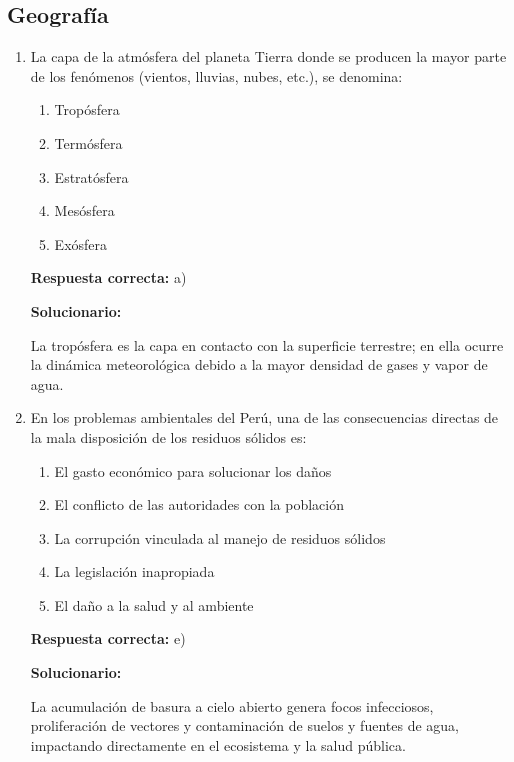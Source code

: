 \subsection*{Geografía}

\begin{enumerate}[resume]
	\item La capa de la atmósfera del planeta Tierra donde se producen la mayor parte de los fenómenos (vientos, lluvias, nubes, etc.), se denomina:
	\begin{enumerate}[label=\alph*)]
		\item Tropósfera
		\item Termósfera
		\item Estratósfera
		\item Mesósfera
		\item Exósfera
	\end{enumerate}
	\textbf{Respuesta correcta:} a)

	\vspace{2mm}
	\textbf{Solucionario:}

	La tropósfera es la capa en contacto con la superficie terrestre; en ella ocurre la dinámica meteorológica debido a la mayor densidad de gases y vapor de agua.

	\vspace{6mm}

	\item En los problemas ambientales del Perú, una de las consecuencias directas de la mala disposición de los residuos sólidos es:
	\begin{enumerate}[label=\alph*)]
		\item El gasto económico para solucionar los daños
		\item El conflicto de las autoridades con la población
		\item La corrupción vinculada al manejo de residuos sólidos
		\item La legislación inapropiada
		\item El daño a la salud y al ambiente
	\end{enumerate}
	\textbf{Respuesta correcta:} e)

	\vspace{2mm}
	\textbf{Solucionario:}

	La acumulación de basura a cielo abierto genera focos infecciosos, proliferación de vectores y contaminación de suelos y fuentes de agua, impactando directamente en el ecosistema y la salud pública.

	\vspace{6mm}


\end{enumerate}
